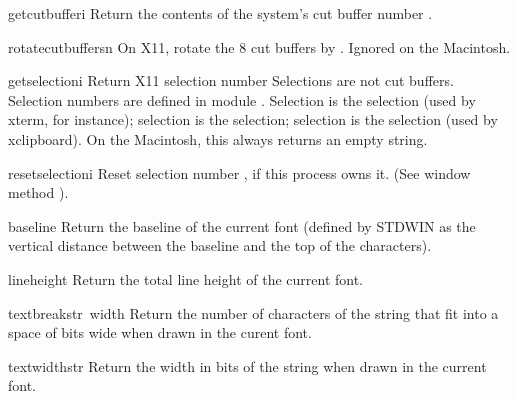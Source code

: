 \begin{funcdesc}{getcutbuffer}{i}
Return the contents of the system's cut buffer number
.
\end{funcdesc}

\begin{funcdesc}{rotatecutbuffers}{n}
On X11, rotate the 8 cut buffers by
.
Ignored on the Macintosh.
\end{funcdesc}

\begin{funcdesc}{getselection}{i}
Return X11 selection number
Selections are not cut buffers.
Selection numbers are defined in module
.
Selection  is the
selection (used by
xterm,
for instance);
selection  is the
selection; selection  is the
selection (used by
xclipboard).
On the Macintosh, this always returns an empty string.
\end{funcdesc}

\begin{funcdesc}{resetselection}{i}
Reset selection number
,
if this process owns it.
(See window method
).
\end{funcdesc}

\begin{funcdesc}{baseline}{}
Return the baseline of the current font (defined by STDWIN as the
vertical distance between the baseline and the top of the
characters).
\end{funcdesc}

\begin{funcdesc}{lineheight}{}
Return the total line height of the current font.
\end{funcdesc}

\begin{funcdesc}{textbreak}{str\, width}
Return the number of characters of the string that fit into a space of
bits wide when drawn in the curent font.
\end{funcdesc}

\begin{funcdesc}{textwidth}{str}
Return the width in bits of the string when drawn in the current font.
\end{funcdesc}

